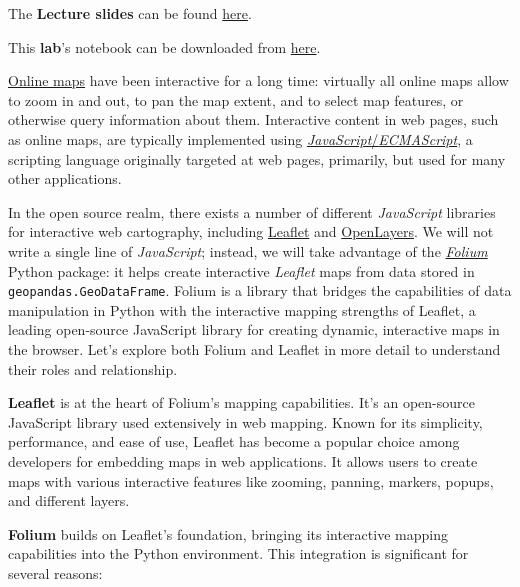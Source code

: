 \documentclass[
  letterpaper,
  DIV=11,
  numbers=noendperiod]{scrreprt}
\begin{document}
The \textbf{Lecture slides} can be found
\href{https://github.com/GDSL-UL/wma/raw/main/lectures/w05.pdf}{here}.

This \textbf{lab}'s notebook can be downloaded from
\href{https://github.com/GDSL-UL/wma/blob/main/labs/w05_interactive.ipynb}{here}.

\href{https://link.springer.com/referenceworkentry/10.1007/978-3-319-23519-6_1485-2}{Online
maps} have been interactive for a long time: virtually all online maps
allow to zoom in and out, to pan the map extent, and to select map
features, or otherwise query information about them. Interactive content
in web pages, such as online maps, are typically implemented using
\href{https://en.wikipedia.org/wiki/ECMAScript}{\emph{JavaScript}/\emph{ECMAScript}},
a scripting language originally targeted at web pages, primarily, but
used for many other applications.

In the open source realm, there exists a number of different
\emph{JavaScript} libraries for interactive web cartography, including
\href{https://leafletjs.com/}{Leaflet} and
\href{https://openlayers.org/}{OpenLayers}. We will not write a single
line of \emph{JavaScript}; instead, we will take advantage of the
\href{https://python-visualization.github.io/folium/}{\emph{Folium}}
Python package: it helps create interactive \emph{Leaflet} maps from
data stored in \texttt{geopandas.GeoDataFrame}. Folium is a library that
bridges the capabilities of data manipulation in Python with the
interactive mapping strengths of Leaflet, a leading open-source
JavaScript library for creating dynamic, interactive maps in the
browser. Let's explore both Folium and Leaflet in more detail to
understand their roles and relationship.

\textbf{Leaflet} is at the heart of Folium's mapping capabilities. It's
an open-source JavaScript library used extensively in web mapping. Known
for its simplicity, performance, and ease of use, Leaflet has become a
popular choice among developers for embedding maps in web applications.
It allows users to create maps with various interactive features like
zooming, panning, markers, popups, and different layers.

\textbf{Folium} builds on Leaflet's foundation, bringing its interactive
mapping capabilities into the Python environment. This integration is
significant for several reasons:
\end{document}
